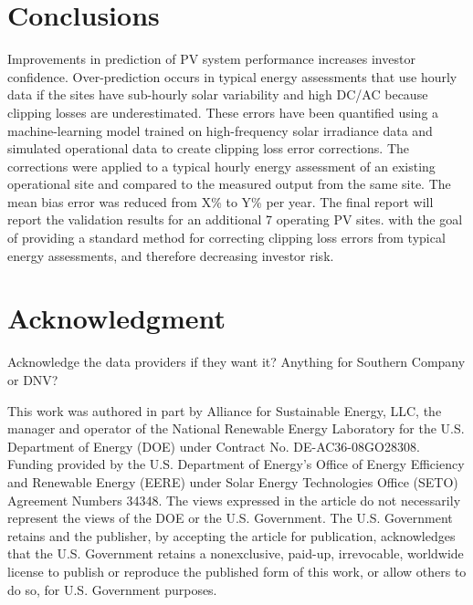\documentclass[conference]{IEEEtran}
\begin{document}
\section{Conclusions}
Improvements in prediction of PV system performance increases investor confidence. Over-prediction occurs in typical energy assessments that use hourly data if the sites have sub-hourly solar variability and high DC/AC because clipping losses are underestimated. These errors have been quantified using a machine-learning model trained on high-frequency solar irradiance data and simulated operational data to create clipping loss error corrections. The corrections were applied to a typical hourly energy assessment of an existing operational site and compared to the measured output from the same site. The mean bias error was reduced from X\% to Y\% per year. The final report will report the validation results for an additional 7 operating PV sites. with the goal of providing a standard method for correcting clipping loss errors from typical energy assessments, and therefore decreasing investor risk.

\section*{Acknowledgment}

Acknowledge the data providers if they want it? Anything for Southern Company or DNV?

This work was authored in part by Alliance for Sustainable Energy, LLC, the manager and operator of the National Renewable Energy Laboratory for the U.S. Department of Energy (DOE) under Contract No. DE-AC36-08GO28308. Funding provided by the U.S. Department of Energy’s Office of Energy Efficiency and Renewable Energy (EERE) under Solar Energy Technologies Office (SETO) Agreement Numbers 34348. The views expressed in the article do not necessarily represent the views of the DOE or the U.S. Government. The U.S. Government retains and the publisher, by accepting the article for publication, acknowledges that the U.S. Government retains a nonexclusive, paid-up, irrevocable, worldwide license to publish or reproduce the published form of this work, or allow others to do so, for U.S. Government purposes.



\end{document}
